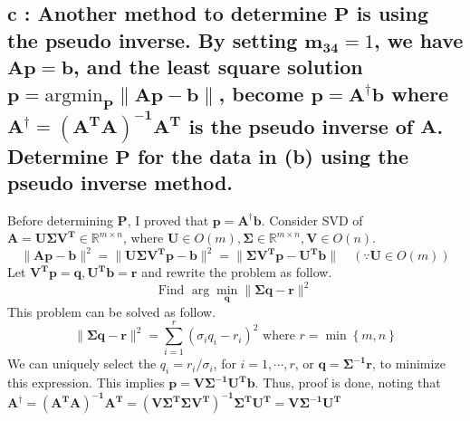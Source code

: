\documentclass[10pt]{article}
\begin{document}
\subsection*{c : Another method to determine $\mathbf{P}$ is using the pseudo inverse. By setting $\mathbf{m_34} = 1$, we have $\mathbf{Ap = b}$, and the least square solution $\mathbf{p = } \text{argmin}_\mathbf{P} \lVert\mathbf{Ap - b}\rVert$, become $\mathbf{p = A^\dagger b}$ where $\mathbf{A^\dagger = (A^TA)^{-1}A^T} $ is the pseudo inverse of $\mathbf{A}$. Determine $\mathbf{P}$ for the data in (b) using the pseudo inverse method.}
Before determining $\mathbf{P}$, I proved that $\mathbf{p} = \mathbf{A}^\dagger \mathbf{b}$.
Consider SVD of $\mathbf{A = U\Sigma V^T} \in \mathbb{R}^{m\times n}$, where $\mathbf{U}\in O(m), \mathbf{\Sigma} \in \mathbb{R}^{m\times n}, \mathbf{V} \in O(n)$.
\begin{equation}
    \lVert \mathbf{Ap-b} \rVert^2 = \lVert \mathbf{U\Sigma V^Tp-b} \rVert^2 = \lVert \mathbf{\Sigma V^Tp - U^Tb} \rVert \quad (\because \mathbf{U}\in O(m))
\end{equation}
Let $\mathbf{V^Tp = q}, \mathbf{U^Tb = r}$ and rewrite the problem as follow.
\begin{equation}
    \text{Find } \arg\min_{\mathbf{q}} \lVert \mathbf{\Sigma q} - \mathbf{r}\rVert^2
\end{equation}
This problem can be solved as follow.
\begin{equation}
    \lVert \mathbf{\Sigma q - r}\rVert^2 = \sum_{i=1}^r (\sigma_iq_i - r_i)^2 \text{ where } r = \min \left\{m,n\right\}
\end{equation}
We can uniquely select the $q_i = r_i/\sigma_i$, for $i = 1,\cdots, r$, or $\mathbf{q = \Sigma^{-1}\mathbf{r}}$, to minimize this expression.
This implies $\mathbf{p = V\Sigma^{-1}U^Tb}$. Thus, proof is done, noting that $\mathbf{A^\dagger = (A^TA)^{-1}A^T = (V\Sigma^T\Sigma V^T)^{-1}\Sigma^TU^T = V\Sigma^{-1}U^T}$
\end{document}
